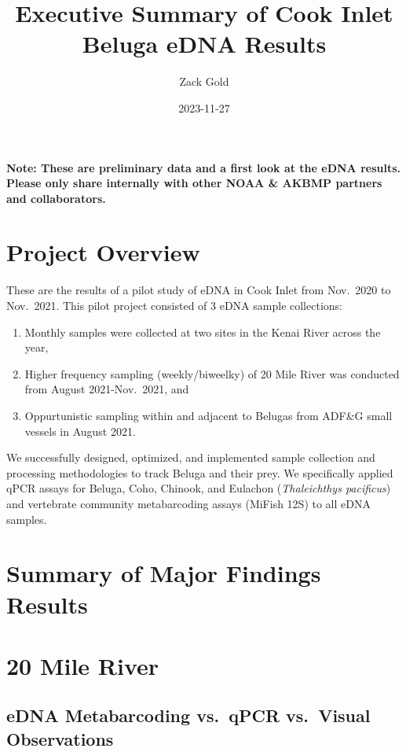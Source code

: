 \documentclass[
]{article}
\title{Executive Summary of Cook Inlet Beluga eDNA Results}
\author{Zack Gold}
\date{2023-11-27}
\begin{document}
\maketitle

\textbf{Note: These are preliminary data and a first look at the eDNA
results. Please only share internally with other NOAA \& AKBMP partners
and collaborators.}

\hypertarget{project-overview}{%
\section{Project Overview}\label{project-overview}}

These are the results of a pilot study of eDNA in Cook Inlet from
Nov.~2020 to Nov.~2021. This pilot project consisted of 3 eDNA sample
collections:

\begin{enumerate}
\def\labelenumi{\arabic{enumi}.}
\item
  Monthly samples were collected at two sites in the Kenai River across
  the year,
\item
  Higher frequency sampling (weekly/biweelky) of 20 Mile River was
  conducted from August 2021-Nov.~2021, and
\item
  Oppurtunistic sampling within and adjacent to Belugas from ADF\&G
  small vessels in August 2021.
\end{enumerate}

We successfully designed, optimized, and implemented sample collection
and processing methodologies to track Beluga and their prey. We
specifically applied qPCR assays for Beluga, Coho, Chinook, and Eulachon
(\emph{Thaleichthys pacificus}) and vertebrate community metabarcoding
assays (MiFish 12S) to all eDNA samples.

\hypertarget{summary-of-major-findings-results}{%
\section{Summary of Major Findings
Results}\label{summary-of-major-findings-results}}

\hypertarget{mile-river}{%
\section{20 Mile River}\label{mile-river}}

\hypertarget{edna-metabarcoding-vs.-qpcr-vs.-visual-observations}{%
\subsection{eDNA Metabarcoding vs.~qPCR vs.~Visual
Observations}\label{edna-metabarcoding-vs.-qpcr-vs.-visual-observations}}
\end{document}
